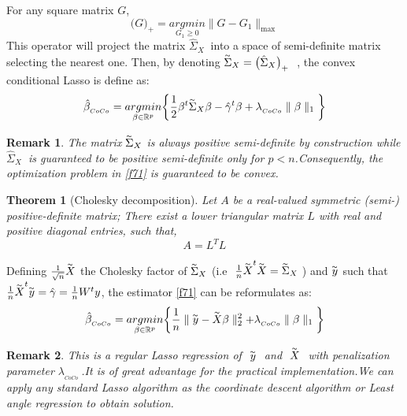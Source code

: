 \documentclass[12pt]{report}
\newtheorem{theoreme}{Theorem}[section] %
\newtheorem{remarque}{Remark}[section]
\begin{document}
For any square matrix $G$, 
\begin{equation}
	\big(G\big)_{+}=\underset{G_{1}\geq0}{argmin}\parallel G-G_{1}\parallel_{\max}
	\label{f70}
\end{equation}
This operator will project the matrix  $\hat{\Sigma}_{X}\ $ into a space of semi-definite matrix selecting the nearest one. Then, by denoting $\overset{_{\thicksim}}{\Sigma}_{X}=\big(\hat{\Sigma}_{X}\big)_{+}\ $ , the convex conditional Lasso is define as:
\begin{equation}
	\hat{\beta}_{_{CoCo}}= \underset{\beta \in \mathbb{R}^{p}}{argmin}\bigg\{\frac{1}{2}\beta^{t}\overset{_{\thicksim}}{\Sigma}_{X}\beta-\hat{\gamma}^{t}\beta+\lambda_{_{CoCo}}\parallel\beta\parallel_{1}\bigg\}
	\label{f71}
\end{equation}
\begin{remarque}
	The matrix $\overset{_{\thicksim}}{\Sigma}_{X}$ is always positive semi-definite by construction while  $\hat{\Sigma}_{X}\ $ is guaranteed to be positive semi-definite only for $p<n$.Consequently, the optimization problem in \eqref{f71} is guaranteed to be convex.
\end{remarque}
\begin{theoreme}[Cholesky decomposition]
	Let $A$ be a real-valued symmetric (semi-) positive-definite matrix; There exist a lower triangular matrix $L$ with real and positive diagonal entries, such that,
	\begin{equation}
		A=L^{T}L
		\label{f72}
	\end{equation}
\end{theoreme}
Defining $ \frac{1}{\sqrt{n}}\overset{_{\thicksim}}{X}$ the Cholesky factor of  $\overset{_{\thicksim}}{\Sigma}_{X}$ (i.e $\ \frac{1}{n}\overset{_{\thicksim}}{X}^{t}\overset{_{\thicksim}}{X}=\overset{_{\thicksim}}{\Sigma}_{X}\ $) and $\overset{_{\thicksim}}{y}$ such that $\frac{1}{n}\overset{_{\thicksim}}{X}^{t}\overset{_{\thicksim}}{y}=\hat{\gamma}=\frac{1}{n}W^{t}y$, the estimator \eqref{f71} can be reformulates as:
\begin{equation}
	\hat{\beta}_{_{CoCo}}= \underset{\beta \in \mathbb{R}^{p}}{argmin}\bigg\{\frac{1}{n}\parallel \overset{_{\thicksim}}{y}- \overset{_{\thicksim}}{X}\beta \parallel^{2}_{2}+\lambda_{_{CoCo}}\parallel\beta\parallel_{1}\bigg\}
	\label{f73}
\end{equation}

\begin{remarque}
	This is a regular Lasso regression of $\ \overset{_{\thicksim}}{y}\ $ and $\ \overset{_{\thicksim}}{X}\ $ with penalization parameter $\lambda_{_{CoCo}}\ $.It is of great advantage for the practical implementation.We can apply any standard Lasso algorithm as the \textit{ coordinate descent algorithm \cite{nref20} or Least angle regression \cite{nref21} } to obtain solution.
\end{remarque}
\end{document}
